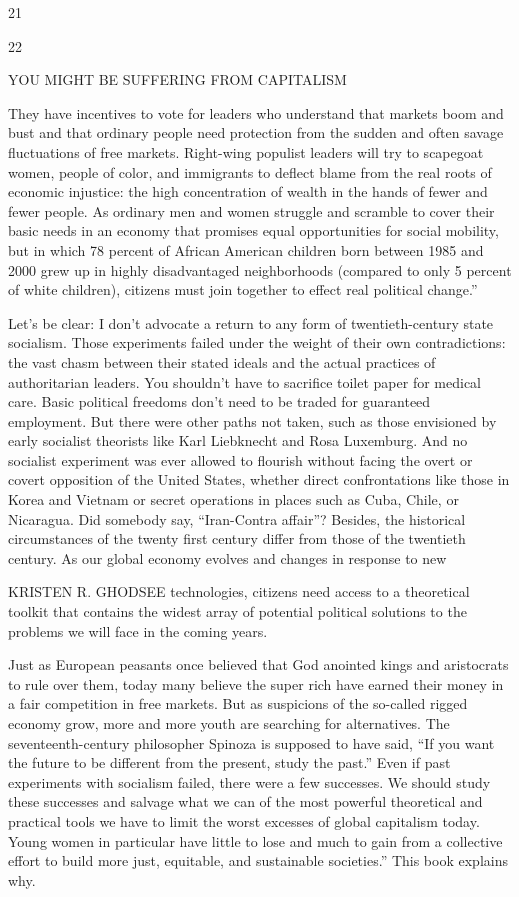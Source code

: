  \par 
21
 \par 
22
 \par 
YOU MIGHT BE SUFFERING FROM CAPITALISM
 \par 
They have incentives to vote for leaders who understand that markets boom and bust and that ordinary people need protection from the sudden and often savage fluctuations of free markets. Right-wing populist leaders will try to scapegoat women, people of color, and immigrants to deflect blame from the real roots of economic injustice: the high concentration of wealth in the hands of fewer and fewer people. As ordinary men and women struggle and scramble to cover their basic needs in an economy that promises equal opportunities for social mobility, but in which {\color{blue}78} percent of African American children born between 1985 and 2000 grew up in highly disadvantaged neighborhoods (compared to only {\color{blue}5} percent of white children), citizens must join together to effect real political change.”
 \par 
Let’s be clear: I don’t advocate a return to any form of twentieth-century state socialism. Those experiments failed under the weight of their own contradictions: the vast chasm between their stated ideals and the actual practices of authoritarian leaders. You shouldn't have to sacrifice toilet paper for medical care. Basic political freedoms don't need to be traded for guaranteed employment. But there were other paths not taken, such as those envisioned by early socialist theorists like Karl Liebknecht and Rosa Luxemburg. And no socialist experiment was ever allowed to flourish without facing the overt or covert opposition of the United States, whether direct confrontations like those in Korea and Vietnam or secret operations in places such as Cuba, Chile, or Nicaragua. Did somebody say, “Iran-Contra affair”? Besides, the historical circumstances of the twenty first century differ from those of the twentieth century. As our global economy evolves and changes in response to new
 \par 
KRISTEN R. GHODSEE technologies, citizens need access to a theoretical toolkit that contains the widest array of potential political solutions to the problems we will face in the coming years.
 \par 
Just as European peasants once believed that God anointed kings and aristocrats to rule over them, today many believe the super rich have earned their money in a fair competition in free markets. But as suspicions of the so-called rigged economy grow, more and more youth are searching for alternatives. The seventeenth-century philosopher Spinoza is supposed to have said, “If you want the future to be different from the present, study the past.” Even if past experiments with socialism failed, there were a few successes. We should study these successes and salvage what we can of the most powerful theoretical and practical tools we have to limit the worst excesses of global capitalism today. Young women in particular have little to lose and much to gain from a collective effort to build more just, equitable, and sustainable societies.” This book explains why.
